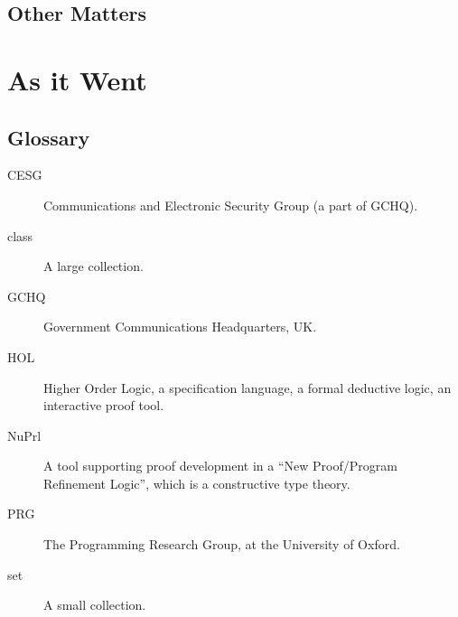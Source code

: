 \documentclass[10pt,titlepage]{book}
\begin{document}
\chapter{Other Matters}

\part{As it Went}

\appendix

\chapter{Glossary}\label{glossary}

\begin{description}
\item[CESG]{} Communications and Electronic Security Group (a part of GCHQ).
\item[class]{} A large collection.
\item[GCHQ]{} Government Communications Headquarters, UK.
\item[HOL]{} Higher Order Logic, a specification language, a formal deductive logic, an interactive proof tool.
\item[NuPrl]{} A tool supporting proof development in a ``New Proof/Program Refinement Logic'', which is a constructive type theory.
\item[PRG]{} The Programming Research Group, at the University of Oxford.
\item[set]{} A small collection.
\end{description}

\backmatter




\label{index}
\twocolumn[]
{\small\printindex}
\end{document}
